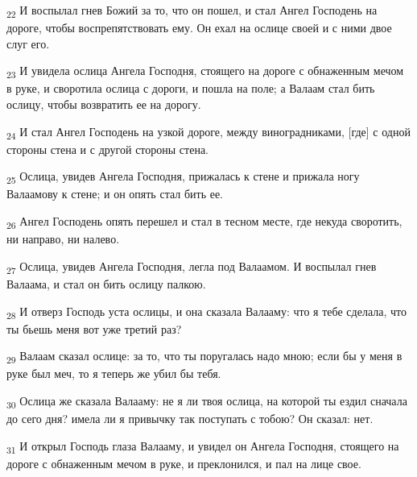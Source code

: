 \begin{tcolorbox}
\textsubscript{22} И воспылал гнев Божий за то, что он пошел, и стал Ангел Господень на дороге, чтобы воспрепятствовать ему. Он ехал на ослице своей и с ними двое слуг его.
\end{tcolorbox}
\begin{tcolorbox}
\textsubscript{23} И увидела ослица Ангела Господня, стоящего на дороге с обнаженным мечом в руке, и своротила ослица с дороги, и пошла на поле; а Валаам стал бить ослицу, чтобы возвратить ее на дорогу.
\end{tcolorbox}
\begin{tcolorbox}
\textsubscript{24} И стал Ангел Господень на узкой дороге, между виноградниками, [где] с одной стороны стена и с другой стороны стена.
\end{tcolorbox}
\begin{tcolorbox}
\textsubscript{25} Ослица, увидев Ангела Господня, прижалась к стене и прижала ногу Валаамову к стене; и он опять стал бить ее.
\end{tcolorbox}
\begin{tcolorbox}
\textsubscript{26} Ангел Господень опять перешел и стал в тесном месте, где некуда своротить, ни направо, ни налево.
\end{tcolorbox}
\begin{tcolorbox}
\textsubscript{27} Ослица, увидев Ангела Господня, легла под Валаамом. И воспылал гнев Валаама, и стал он бить ослицу палкою.
\end{tcolorbox}
\begin{tcolorbox}
\textsubscript{28} И отверз Господь уста ослицы, и она сказала Валааму: что я тебе сделала, что ты бьешь меня вот уже третий раз?
\end{tcolorbox}
\begin{tcolorbox}
\textsubscript{29} Валаам сказал ослице: за то, что ты поругалась надо мною; если бы у меня в руке был меч, то я теперь же убил бы тебя.
\end{tcolorbox}
\begin{tcolorbox}
\textsubscript{30} Ослица же сказала Валааму: не я ли твоя ослица, на которой ты ездил сначала до сего дня? имела ли я привычку так поступать с тобою? Он сказал: нет.
\end{tcolorbox}
\begin{tcolorbox}
\textsubscript{31} И открыл Господь глаза Валааму, и увидел он Ангела Господня, стоящего на дороге с обнаженным мечом в руке, и преклонился, и пал на лице свое.
\end{tcolorbox}
